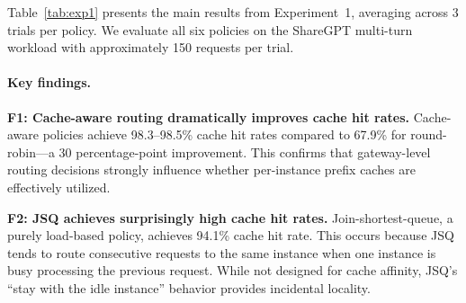 \documentclass{article}
\begin{document}
Table~\ref{tab:exp1} presents the main results from Experiment~1, averaging across 3 trials per policy. We evaluate all six policies on the ShareGPT multi-turn workload with approximately 150 requests per trial.

\begin{table}[H]
    \caption{Policy comparison on ShareGPT multi-turn chat workload (mean $\pm$ std across 3 trials). Cache hit rate and load imbalance are measured from vLLM Prometheus metrics. \textbf{Bold} indicates best in category.}
    \label{tab:exp1}
    \centering
    \small
\end{table}

\paragraph{Key findings.}

\textbf{F1: Cache-aware routing dramatically improves cache hit rates.} Cache-aware policies achieve 98.3--98.5\% cache hit rates compared to 67.9\% for round-robin---a 30 percentage-point improvement. This confirms that gateway-level routing decisions strongly influence whether per-instance prefix caches are effectively utilized.

\textbf{F2: JSQ achieves surprisingly high cache hit rates.} Join-shortest-queue, a purely load-based policy, achieves 94.1\% cache hit rate. This occurs because JSQ tends to route consecutive requests to the same instance when one instance is busy processing the previous request. While not designed for cache affinity, JSQ's ``stay with the idle instance'' behavior provides incidental locality.
\end{document}
